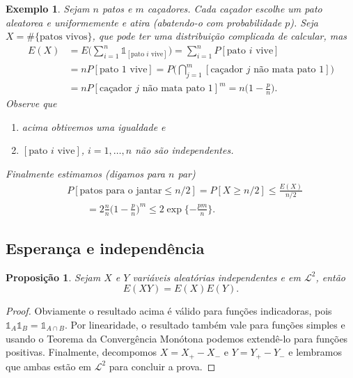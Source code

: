 \documentclass[reqno]{article}
\newcommand*\1{\mathds{1}}
\newtheorem{proposition}[theorem]{Proposição}
\newtheorem{example}{Exemplo}[section]
\newcommand{\mcap}{\textstyle \bigcap\limits}
\begin{document}
\begin{example}
  Sejam $n$ patos e $m$ caçadores.
  Cada caçador escolhe um pato aleatorea e uniformemente e atira (abatendo-o com probabilidade $p$).
  Seja $X = \# \{\text{patos vivos}\}$, que pode ter uma distribuição complicada de calcular, mas
  \begin{equation}
    \begin{split}
      E(X) &= E \Big( \sum_{i=1}^n \1_{[\text{pato $i$ vive}]} \Big) = \sum_{i=1}^n P[\text{pato $i$ vive}]\\
      &= n P[\text{pato $1$ vive}] = P\Big( \mcap_{j=1}^m [\text{caçador $j$ não mata pato $1$}] \Big)\\
      &= n P[\text{caçador $j$ não mata pato $1$}]^m = n \Big(1 - \frac{p}{n}\Big).
    \end{split}
  \end{equation}
  Observe que
  \begin{enumerate}
  \item acima obtivemos uma igualdade e
  \item $[\text{pato $i$ vive}]$, $i = 1, \dots, n$ não são independentes.
  \end{enumerate}

  Finalmente estimamos (digamos para $n$ par)
  \begin{equation}
    \begin{split}
      & P[\text{patos para o jantar} \leq n/2] = P[X \geq n/2] \leq \frac{E(X)}{n/2}\\
      & \qquad = 2 \frac{n}{n} \Big( 1 - \frac{p}{n}\Big)^m \leq 2 \exp \{- \frac{pm}{n}\}.
    \end{split}
  \end{equation}
\end{example}


\newpage

\subsection{Esperança e independência}

\begin{proposition}
  Sejam $X$ e $Y$ variáveis aleatórias independentes e em $\mathcal{L}^2$, então
  \begin{equation}
    E(XY) = E(X) E(Y).
  \end{equation}
\end{proposition}

\begin{proof}
  Obviamente o resultado acima é válido para funções indicadoras, pois $\1_A \1_B = \1_{A \cap B}$.
  Por linearidade, o resultado também vale para funções simples e usando o Teorema da Convergência Monótona podemos extendê-lo para funções positivas.
  Finalmente, decompomos $X = X_+ - X_-$ e $Y = Y_+ - Y_-$ e lembramos que ambas estão em $\mathcal{L}^2$ para concluir a prova.
\end{proof}
\end{document}
